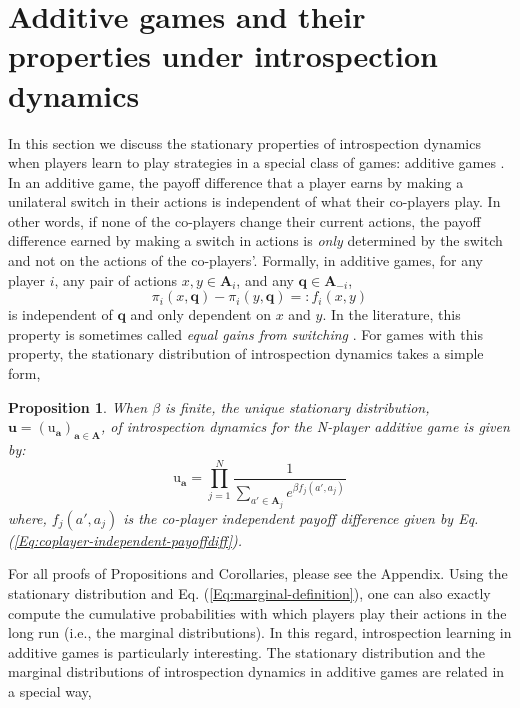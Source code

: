 \documentclass[11pt]{article}
\theoremstyle{plainCl1}
\newtheorem{Prop}{Proposition}
\theoremstyle{plainCl2}
\newcommand{\A}{\mathbf{A}}
\newcommand{\abf}{\mathbf{a}}
\newcommand{\qbf}{\mathbf{q}}
\newcommand{\ubf}{\mathbf{u}}
\begin{document}
\section{Additive games and their properties under introspection dynamics}
In this section we discuss the stationary properties of introspection dynamics when players learn to play strategies in a special class of games: additive games \cite{McAvoy:PlosCB:2015, Pena:JTB:2014}. In an additive game, the payoff difference that a player earns by making a unilateral switch in their actions is independent of what their co-players play. In other words, if none of the co-players change their current actions, the payoff difference earned by making a switch in actions is \emph{only} determined by the switch and not on the actions of the co-players'. Formally, in additive games, for any player $i$, any pair of actions $x,y \in \A_i$, and any $\qbf \in \A_{-i}$,
\begin{equation}
\pi_i(x, \qbf) - \pi_i(y, \qbf) =: f_i(x,y) 
\label{Eq:coplayer-independent-payoffdiff}
\end{equation}
\noindent is independent of $\qbf$ and only dependent on $x$ and $y$. In the literature, this property is sometimes called \emph{equal gains from switching} \cite{Pena:JTB:2014}. For games with this property, the stationary distribution of introspection dynamics takes a simple form,

 \begin{Prop}
When $\beta$ is finite, the unique stationary distribution, $\ubf = (\mathrm{u}_\abf)_{\abf \in \A}$, of introspection dynamics for the N-player additive game is given by: 
\begin{equation}
\mathrm{u}_\abf = \prod_{j=1}^N \frac{1}{\displaystyle \sum_{a' \in \A_j} e^{\beta f_j(a', a_j)}} 
\label{Eq:additive-game-stationary-distribution}
\end{equation}
where, $f_j(a', a_j)$ is the co-player independent payoff difference given by Eq. (\ref{Eq:coplayer-independent-payoffdiff}).

\label{Th:additive-games-stationary-dist}
\end{Prop}
\noindent For all proofs of Propositions and Corollaries, please see the Appendix. Using the stationary distribution and Eq. (\ref{Eq:marginal-definition}), one can also exactly compute the cumulative probabilities with which players play their actions in the long run (i.e., the marginal distributions). In this regard, introspection learning in additive games is particularly interesting. The stationary distribution and the marginal distributions of introspection dynamics in additive games are related in a special way, 
\end{document}
